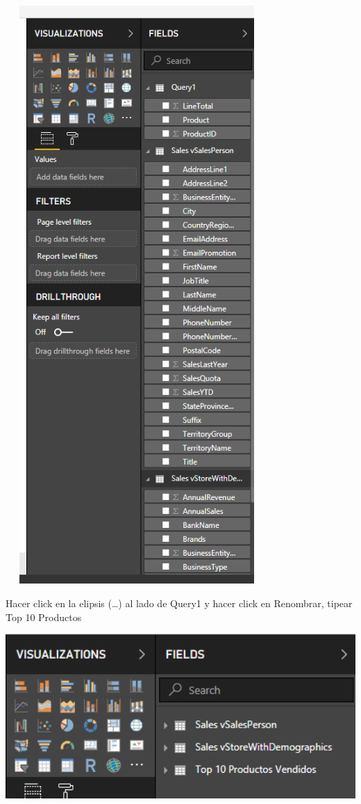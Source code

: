 \documentclass[12pt,letterpaper]{article}
\begin{document}
\begin{center}
    \includegraphics[width=10cm,height=22cm]{img/16.png}  
\end{center}
Hacer click en la elipsis (…) al lado de Query1 y hacer click en Renombrar, tipear Top 10 Productos
\begin{center}
    \includegraphics[width=16cm]{img/17.png}  
\end{center}
\end{document}
